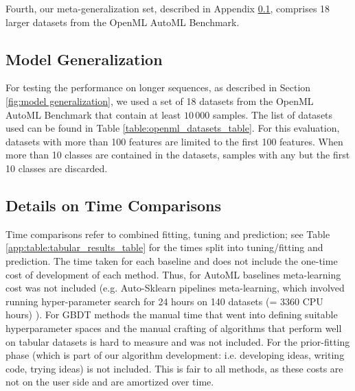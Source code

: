 \documentclass{article}
\begin{document}
Fourth, our meta-generalization set, described in Appendix \ref{app:ssec:abl_generalization}, comprises 18 larger datasets from the OpenML AutoML Benchmark.

\subsection{Model Generalization}\label{app:ssec:abl_generalization}
For testing the \methodname{} performance on longer sequences, as described in Section \ref{fig:model generalization}, we used a set of 18 datasets from the OpenML AutoML Benchmark that contain at least $10\,000$ samples. The list of datasets used can be found in Table \ref{table:openml_datasets_table}. %
For this evaluation, datasets with more than 100 features are limited to the first 100 features. When more than 10 classes are contained in the datasets, samples with any but the first 10 classes are discarded. 

\subsection{Details on Time Comparisons}
\label{app:time_comparison_discussion}
Time comparisons refer to combined fitting, tuning and prediction; see Table \ref{app:table:tabular_results_table} for the times split into tuning/fitting and prediction.
The time taken for each baseline and \methodname{} does not include the one-time cost of development of each method.
Thus, for AutoML baselines meta-learning cost was not included (e.g. Auto-Sklearn pipelines meta-learning, which involved running hyper-parameter search for 24 hours on 140 datasets (= 3360 CPU hours) \citep{feurer-arxiv20v2}). For GBDT methods the manual time that went into defining suitable hyperparameter spaces and the manual crafting of algorithms that perform well on tabular datasets is hard to measure and was not included.
For \methodname{} the prior-fitting phase (which is part of our algorithm development: i.e. developing ideas, writing code, trying ideas) is not included.
This is fair to all methods, as these costs are not on the user side and are amortized over time.
\end{document}
